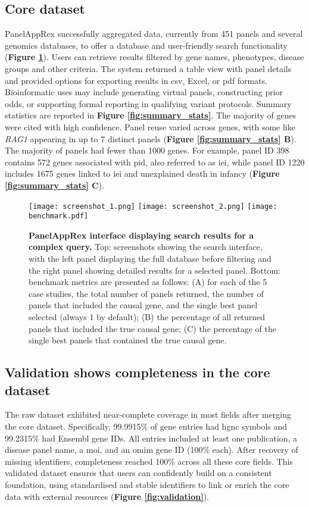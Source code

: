 \subsection{Core dataset}
PanelAppRex successfully aggregated data, currently from 451 panels and several genomics databases, to offer a database and user-friendly search functionality (\textbf{Figure \ref{fig:performance}}).
Users can retrieve results filtered by gene names, phenotypes, disease groups and other criteria. 
The system returned a table view with panel details and provided options for exporting results in \ac{csv}, Excel, or \ac{pdf} formats.
Bioinformatic uses may include generating virtual panels, constructing prior odds, or supporting formal reporting in qualifying variant protocols.
Summary statistics are reported in 
\textbf{Figure \ref{fig:summary_stats}}. The majority of genes were cited with high confidence. 
Panel reuse varied across genes, with some like \textit{RAG1} appearing in up to 7 distinct panels 
(\textbf{Figure \ref{fig:summary_stats} B}). 
The majority of panels had fewer than 1000 genes.
For example, panel ID 398 contains 572 genes associated with \ac{pid}, also referred to as \ac{iei}, while panel ID 1220 includes 1675 genes linked to \ac{iei} and unexplained death in infancy 
(\textbf{Figure \ref{fig:summary_stats} C}).

\begin{figure}[ht]
    \centering
    \texttt{[image: screenshot\_1.png]}
    \texttt{[image: screenshot\_2.png]}    
    \texttt{[image: benchmark.pdf]}    
\caption{\textbf{PanelAppRex interface displaying search results for a complex query.} Top: screenshots showing the search interface, with the left panel displaying the full database before filtering and the right panel showing detailed results for a selected panel. Bottom: benchmark metrics are presented as follows: (A) for each of the 5 case studies, the total number of panels returned, the number of panels that included the causal gene, and the single best panel selected (always 1 by default); (B) the percentage of all returned panels that included the true causal gene; (C) the percentage of the single best panels that contained the true causal gene.}
    \label{fig:performance}
\end{figure}

\subsection{Validation shows completeness in the core dataset}
\noindent
The raw dataset exhibited near-complete coverage in most fields after merging the core dataset. 
Specifically, 99.9915\% of gene entries had \ac{hgnc} symbols %
and 99.2315\% had Ensembl gene IDs. %
All entries included at least one publication, a disease panel name, a \ac{moi}, and an \ac{omim} gene ID (100\% each). 
After recovery of missing identifiers, completeness reached 100\% across all these core fields.
This validated dataset ensures that users can confidently build on a consistent foundation, using standardised and stable identifiers to link or enrich the core data with external resources (\textbf{Figure \ref{fig:validation}}).

